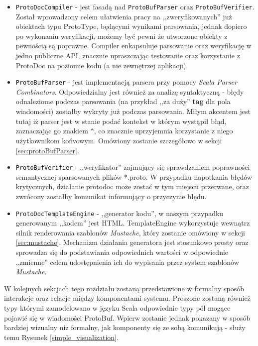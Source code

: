 \documentclass[pdflatex,11pt]{aghdpl}
\begin{document}
\begin{itemize}
 \item \verb|ProtoDocCompiler| - jest fasadą nad \verb|ProtoBufParser| oraz \verb|ProtoBufVerifier|. Został wprowadzony celem 
                                 ułatwienia pracy na ,,zweryfikowanych'' już obiektach typu ProtoType, będącymi wynikami parsowania,
                                 jednak dopiero po wykonaniu weryfikacji, możemy być pewni że utworzone obiekty z pewnością są poprawne. 
                                 Compiler enkapsuluje parsowanie oraz weryfikację w jedno publiczne API, znacznie upraszczając testowanie oraz korzystanie z
				 ProtoDoc na poziomie kodu (a nie zewnętrzej aplikacji).
 \item \verb|ProtoBufParser| - jest implementacją parsera przy pomocy \textit{Scala Parser Combinators}. Odpowiedzialny jest również za analizę syntaktyczną - 
                               błędy odnaleziome podczas parsowania (na przykład ,,za duży'' \textbf{tag} dla pola wiadomości) zostałby wykryty już podczas parsowania.
			       Miłym akcentem jest tutaj iż parser jest w stanie podać kontekst w którym wystąpił błąd, zaznaczając go znakiem \verb|^|, 
			       co znacznie uprzyjemnia korzystanie z niego użytkownikom końvowym.
                               Omówiony zostanie szczegółowo w sekcji \ref{sec:protoBufParser}.

 \item \verb|ProtoBufVerifier| - ,,weryfikator'' zajmujący się sprawdzaniem poprawności semantycznej sparsowanych plików *.proto.
                                 W przypadku napotkania błędów krytycznych, działanie protodoc może zostać w tym miejscu przerwane,
                                 oraz zwrócony zostałby komunikat informujący o przyczynie błędu.
 \item \verb|ProtoDocTemplateEngine| - ,,generator kodu'', w naszym przypadku generowanym ,,kodem'' jest HTML. TemplateEngine wykorzystuje 
                                     wewnątrz silnik renderowania szablonów \textit{Mustache}, który zostanie omówiony w sekcji \ref{sec:mustache}.
                                     Mechanizm działania generatora jest stosunkowo prosty oraz sprowadza się do podstawiania odpowiednich wartości 
				     w odpowiednie ,,zmienne'' celem udostępnienia ich do wypisania przez system szablonów \textit{Mustache}.
\end{itemize}

\newpage 

W kolejnych sekcjach tego rozdziału zostaną przedstawione w formalny sposób interakcje oraz relacje między komponentami systemu.
Proszone zostaną również typy którymi zamodelowano w języku Scala odpowiednie typy pól mogące pojawić się w wiadomości ProtoBuf.
Wpierw zostanie jednak pokazany w sposób bardziej wizualny niż formalny, jak komponenty się ze sobą komunikują - służy temu Rysunek \ref{simple_visualization}.
\end{document}
